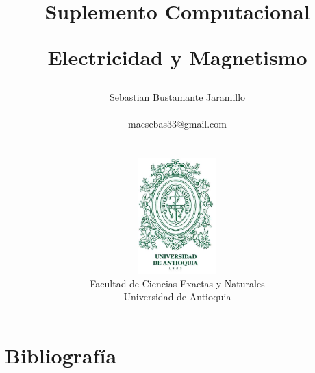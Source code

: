 \documentclass[12pt]{book}
\begin{document}
\title{Suplemento Computacional \\
\begin{Huge}
\textbf{Electricidad y Magnetismo}
\end{Huge}}
\author{ Sebastian Bustamante Jaramillo\\ \begin{small}
macsebas33@gmail.com
\end{small} \\ \vspace{5cm} \\
\includegraphics[width=3cm]{pictures/UdeA_Shield} \\
Facultad de Ciencias Exactas y Naturales \\ 
Universidad de Antioquia }
\date{}
\maketitle



\newpage{\pagestyle{empty}\cleardoublepage}  

\tableofcontents
\newpage{\pagestyle{empty}\cleardoublepage}  














\chapter{Bibliografía}
\end{document}
